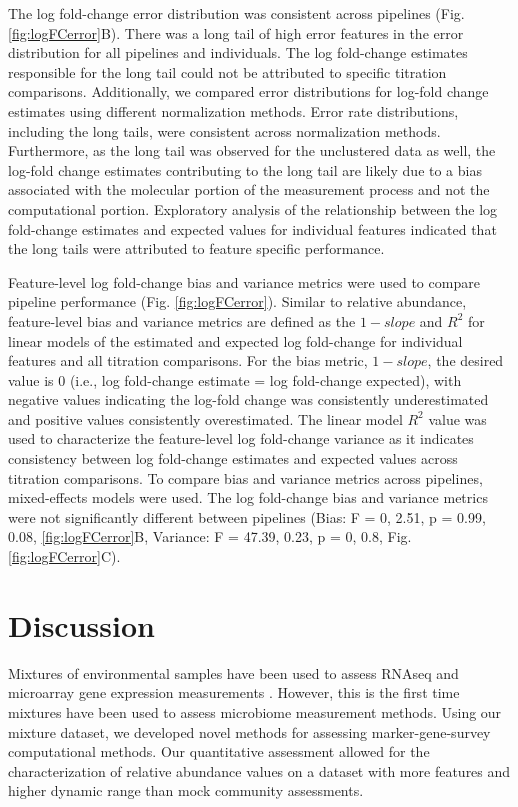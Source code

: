\documentclass[linenumbers]{bmcart}
\begin{document}
The log fold-change error distribution was consistent across pipelines
(Fig. \ref{fig:logFCerror}B). There was a long tail of high error
features in the error distribution for all pipelines and individuals.
The log fold-change estimates responsible for the long tail could not be
attributed to specific titration comparisons. Additionally, we compared
error distributions for log-fold change estimates using
different normalization methods. Error rate distributions, including the
long tails, were consistent across normalization methods. Furthermore,
as the long tail was observed for the unclustered data as well, the
log-fold change estimates contributing to the long tail are likely due
to a bias associated with the molecular portion of the
measurement process and not the computational portion. Exploratory
analysis of the relationship between the log fold-change estimates and
expected values for individual features indicated that the long tails
were attributed to feature specific performance.

Feature-level log fold-change bias and variance metrics were used to
compare pipeline performance (Fig. \ref{fig:logFCerror}). Similar to
relative abundance, feature-level bias and variance metrics are defined
as the \(1 - slope\) and \(R^2\) for linear models of the estimated and
expected log fold-change for individual features and all titration
comparisons. For the bias metric, \(1 - slope\), the desired value is 0
(i.e., log fold-change estimate = log fold-change expected), with
negative values indicating the log-fold change was consistently
underestimated and positive values consistently overestimated. The
linear model \(R^2\) value was used to characterize the feature-level
log fold-change variance as it indicates consistency between log
fold-change estimates and expected values across titration comparisons.
To compare bias and variance metrics across pipelines, mixed-effects
models were used. The log fold-change bias and variance metrics were not
significantly different between pipelines (Bias: F = 0, 2.51, p = 0.99,
0.08, \ref{fig:logFCerror}B, Variance: F = 47.39, 0.23, p = 0, 0.8, Fig.
\ref{fig:logFCerror}C).


\section*{Discussion}
Mixtures of environmental samples have been used to assess
RNAseq and microarray gene expression measurements \cite{parsons2015using, pine2011adaptable, thompson2005use}. However, this is the
first time mixtures have been used to assess microbiome measurement
methods. Using our mixture dataset, we developed novel methods for
assessing marker-gene-survey computational methods. Our quantitative
assessment allowed for the characterization of relative abundance values
on a dataset with more features and higher dynamic range than mock community assessments.
\end{document}
